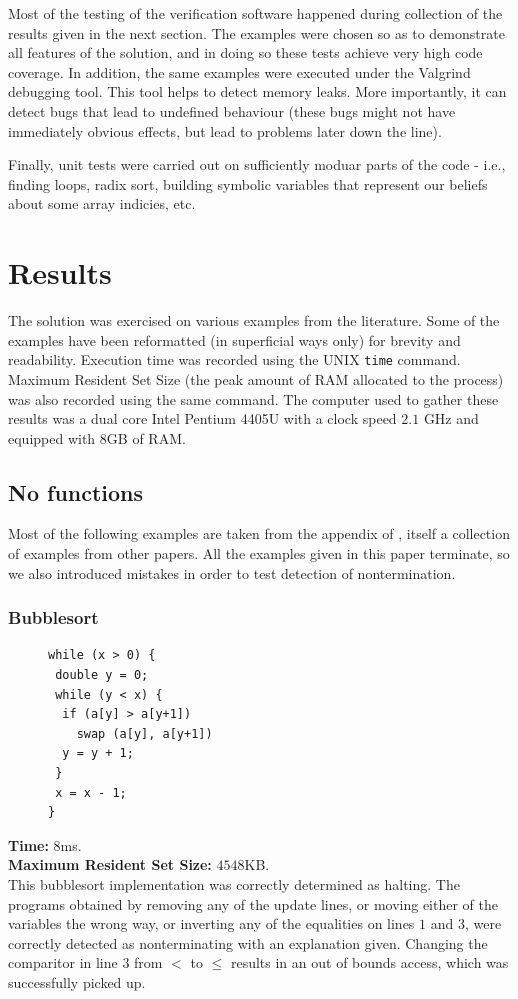 \documentclass[12pt,a4paper]{article}
\begin{document}
Most of the testing of the verification software happened during collection of the results given in the next section. The examples were chosen so as to demonstrate all features of the solution,
and in doing so these tests achieve very high code coverage. In addition, the same examples were executed under the Valgrind debugging tool. This tool helps to detect memory leaks. More importantly, it can detect bugs that lead to undefined behaviour (these bugs might not have immediately obvious effects, but lead to problems later down the line).

Finally, unit tests were carried out on sufficiently moduar parts of the code - i.e., finding loops, radix sort, building symbolic variables that represent our beliefs about some array indicies,
etc.

\newpage
\section{Results}
The solution was exercised on various examples from the literature. Some of the examples have been reformatted (in superficial ways only)
 for brevity and readability.
Execution time was recorded using the UNIX \texttt{time} command. Maximum Resident Set Size (the peak amount of RAM allocated to the process) was also recorded using the same command. The computer used to gather these results was a dual core Intel Pentium 4405U with a clock speed $2.1$ GHz and
equipped with $8$GB of RAM.
\subsection{No functions}
Most of the following examples are taken from the appendix of \citep{tra}, itself a collection of examples from other papers.  All the examples given in this paper terminate, so we also introduced mistakes in order to test detection of nontermination.

\subsubsection{Bubblesort}
\begin{figure}
\centering
\begin{lstlisting}[frame=tlrb,language=myLang]
while (x > 0) {
 double y = 0;
 while (y < x) {
  if (a[y] > a[y+1])
    swap (a[y], a[y+1])
  y = y + 1;
 }
 x = x - 1;
}
\end{lstlisting}
\end{figure}
\textbf{Time:} $8$ms.\\ \textbf{Maximum Resident Set Size:} $4548$KB.\\
This bubblesort implementation was correctly determined as halting. The programs obtained by removing any of the update lines, or moving either of the variables the wrong way, or inverting any of the equalities on lines $1$ and $3$, were correctly detected as nonterminating with an explanation given. Changing the comparitor in line $3$ from $<$ to $\leq$ results in an out of bounds access, which was successfully picked up.\\
\end{document}
